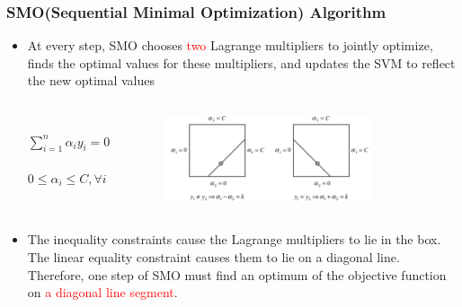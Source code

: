 \documentclass{beamer}
\begin{document}
\begin{frame}
	\frametitle{SMO(Sequential Minimal Optimization) Algorithm}	 
	\begin{itemize}
		\item At every step, SMO chooses \textcolor{red}{two} Lagrange multipliers to jointly optimize, finds the
		optimal values for these multipliers, and updates the SVM to reflect the new optimal values
		
		\begin{columns}[c] %
			
				 \\
				$\sum_{i=1}^{n}\alpha_iy_i=0$ \\
				 \\
				$0 \leq \alpha_i \leq C, \forall i$	
			
				\begin{figure}
					\includegraphics[width=0.8\textwidth]{fig/two_lagrange_opt.png}
				\end{figure}
		\end{columns}
		\item 
		The inequality constraints cause the Lagrange multipliers to lie in the box. The linear equality
		constraint causes them to lie on a diagonal line. Therefore, one step of SMO must find an
		optimum of the objective function on \textcolor{red}{a diagonal line segment}.
	\end{itemize}	
\end{frame}
\end{document}
